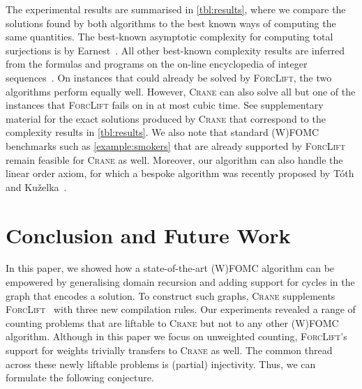 \documentclass{article}
\theoremstyle{definition}
\begin{document}
The experimental results are summarised in \cref{tbl:results}, where we compare
the solutions found by both algorithms to the best known ways of computing the
same quantities. The best-known asymptotic complexity for computing total
surjections is by Earnest~. All other best-known complexity
results are inferred from the formulas and programs on the on-line encyclopedia
of integer sequences~\cite{oeis}. On instances that could already be solved by
\textsc{ForcLift}, the two algorithms perform equally well. However,
\textsc{Crane} can also solve all but one of the instances that
\textsc{ForcLift} fails on in at most cubic time. See supplementary material for
the exact solutions produced by \textsc{Crane} that correspond to the complexity
results in \cref{tbl:results}. We also note that standard (W)FOMC benchmarks
such as \cref{example:smokers} that are already supported by \textsc{ForcLift}
remain feasible for \textsc{Crane} as well. Moreover, our algorithm can also
handle the linear order axiom, for which a bespoke algorithm was recently
proposed by T{\'{o}}th and
Ku\v{z}elka~.

\section{Conclusion and Future Work}\label{sec:conclusion}

In this paper, we showed how a state-of-the-art (W)FOMC algorithm can be
empowered by generalising domain recursion and adding support for cycles in the
graph that encodes a solution. To construct such graphs, \textsc{Crane}
supplements \textsc{ForcLift}~\cite{DBLP:conf/ijcai/BroeckTMDR11} with three
new compilation rules. Our experiments revealed a range of counting problems
that are liftable to \textsc{Crane} but not to any other (W)FOMC algorithm.
Although in this paper we focus on unweighted counting, \textsc{ForcLift}'s
support for weights trivially transfers to \textsc{Crane} as well. The common
thread across these newly liftable problems is (partial) injectivity. Thus, we
can formulate the following conjecture.
\end{document}

